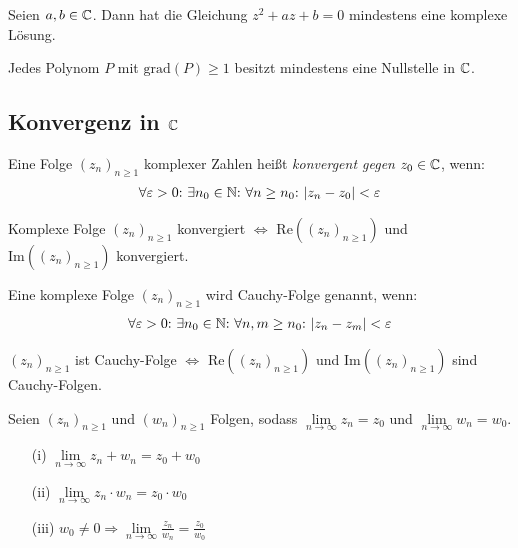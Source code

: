 \begin{framedthm}
	Seien $a,b \in \mathbb{C}$. Dann hat die Gleichung $z^2 + az + b = 0$ mindestens eine komplexe Lösung.
\end{framedthm}

\begin{framedthm}
	Jedes Polynom $P$ mit $\textrm{grad}(P) \geq 1$ besitzt mindestens eine Nullstelle in $\mathbb{C}$.
\end{framedthm}

\subsection{Konvergenz in $\mathbb{C}$}

\begin{frameddefn}
	Eine Folge $(z_n)_{n\geq 1}$ komplexer Zahlen heißt \textit{konvergent gegen} $z_0 \in \mathbb{C}$, wenn:
	\begin{align*}
		\forall \varepsilon > 0{:}\  \exists n_0 \in \mathbb{N}{:}\  \forall n \geq n_0{:}\  |z_n - z_0| < \varepsilon
	\end{align*}
\end{frameddefn}


\begin{framedthm}
	Komplexe Folge $(z_n)_{n\geq 1}$ konvergiert $\iff$ $\textrm{Re}((z_n)_{n\geq 1})$ und $\textrm{Im}((z_n)_{n\geq 1})$ konvergiert.
\end{framedthm}

\begin{frameddefn}
	Eine komplexe Folge $(z_n)_{n\geq 1}$ wird Cauchy-Folge genannt, wenn:
	\begin{align*}
		\forall \varepsilon > 0{:}\  \exists n_0 \in \mathbb{N}{:}\  \forall n,m \geq n_0{:}\  |z_n - z_m| < \varepsilon
	\end{align*}
\end{frameddefn}

\begin{framedthm}
	$(z_n)_{n\geq 1}$ ist Cauchy-Folge $\iff$ $\textrm{Re}((z_n)_{n\geq 1})$ und $\textrm{Im}((z_n)_{n\geq 1})$ sind Cauchy-Folgen.
\end{framedthm}


\begin{framedthm}
	Seien $(z_n)_{n\geq 1}$ und $(w_n)_{n\geq 1}$ Folgen, sodass $\lim\limits_{n \to \infty} z_n = z_0$ und $\lim\limits_{n \to \infty} w_n = w_0$.
	\begin{enumerate}
		\item[(i)]  $\lim\limits_{n \to \infty} z_n + w_n = z_0 + w_0$
		\item[(ii)]  $\lim\limits_{n \to \infty} z_n \cdot w_n = z_0 \cdot w_0$
		\item[(iii)] $w_0 \neq 0 \Rightarrow \lim\limits_{n \to \infty} \frac{z_n}{w_n} = \frac{z_0}{w_0}$ 
	\end{enumerate}
	
\end{framedthm}


